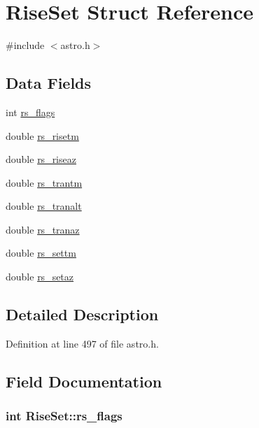 \hypertarget{struct_rise_set}{\section{Rise\-Set Struct Reference}
\label{struct_rise_set}
}


{\ttfamily \#include $<$astro.\-h$>$}

\subsection*{Data Fields}
\begin{DoxyCompactItemize}
\item 
int \hyperlink{struct_rise_set_a905112ea42fd694c67ec3703b566a046}{rs\-\_\-flags}
\item 
double \hyperlink{struct_rise_set_a266796aca0a2f90dc748d9cb2ae8a42a}{rs\-\_\-risetm}
\item 
double \hyperlink{struct_rise_set_a5f7fc8d08178fb7aa9934d21770105fb}{rs\-\_\-riseaz}
\item 
double \hyperlink{struct_rise_set_a1cd5d4547fcea9ae11a8210ed9c39add}{rs\-\_\-trantm}
\item 
double \hyperlink{struct_rise_set_a59bfd7c06bdb640a9b1d15ef3351e8e0}{rs\-\_\-tranalt}
\item 
double \hyperlink{struct_rise_set_a8b1030e15f24d1125ebf411eb9257e66}{rs\-\_\-tranaz}
\item 
double \hyperlink{struct_rise_set_ae0401958f5ba594cf9f60e55dd5f7a88}{rs\-\_\-settm}
\item 
double \hyperlink{struct_rise_set_a56c063092c6dfe083013448c97300615}{rs\-\_\-setaz}
\end{DoxyCompactItemize}


\subsection{Detailed Description}


Definition at line 497 of file astro.\-h.



\subsection{Field Documentation}
\hypertarget{struct_rise_set_a905112ea42fd694c67ec3703b566a046}{
\subsubsection[{rs\-\_\-flags}]{\setlength{\rightskip}{0pt plus 5cm}int Rise\-Set\-::rs\-\_\-flags}}\label{struct_rise_set_a905112ea42fd694c67ec3703b566a046}


